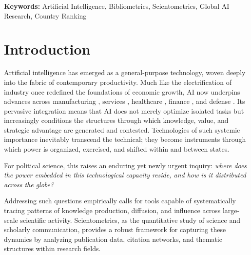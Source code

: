 \documentclass{article}
\begin{document}
\vspace{2cm} %

\begin{flushleft}

\hspace*{1cm}\textbf{Keywords:} Artificial Intelligence, Bibliometrics, Scientometrics, Global AI Research, Country Ranking



\end{flushleft}

\newpage

\tableofcontents
\thispagestyle{empty}
\newpage


\twocolumn

\section{Introduction}

Artificial intelligence has emerged as a general-purpose technology, woven deeply into the fabric of contemporary productivity. Much like the electrification of industry once redefined the foundations of economic growth, AI now underpins advances across manufacturing \cite{kim2022recent}, services \cite{huang2018artificial}, healthcare \cite{alkuwaiti2023review}, finance \cite{bahoo2024artificial}, and defense \cite{sabouri2024newgeopolitics} \cite{vance2023geopolitical}. Its pervasive integration means that AI does not merely optimize isolated tasks but increasingly conditions the structures through which knowledge, value, and strategic advantage are generated and contested. Technologies of such systemic importance inevitably transcend the technical; they become instruments through which power is organized, exercised, and shifted within and between states.

For political science, this raises an enduring yet newly urgent inquiry: \emph{where does the power embedded in this technological capacity reside, and how is it distributed across the globe?}

Addressing such questions empirically calls for tools capable of systematically tracing patterns of knowledge production, diffusion, and influence across large-scale scientific activity. Scientometrics, as the quantitative study of science and scholarly communication, provides a robust framework for capturing these dynamics by analyzing publication data, citation networks, and thematic structures within research fields.
\end{document}
